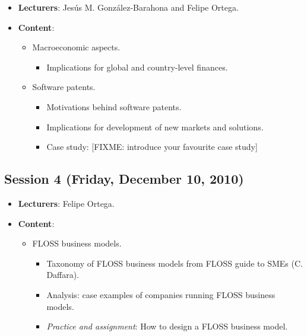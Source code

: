 \documentclass[a4paper]{article}
\begin{document}
\begin{itemize}
 \item \textbf{Lecturers}: Jesús M. González-Barahona and Felipe Ortega.

 \item \textbf{Content}:

    \begin{itemize}
     \item Macroeconomic aspects.
      \begin{itemize}
       \item Implications for global and country-level finances.
       
      \end{itemize}

     \item Software patents.
	\begin{itemize}
	 \item Motivations behind software patents.
	 \item Implications for development of new markets and solutions.
         \item Case study: [FIXME: introduce your favourite case study]
	\end{itemize}

    \end{itemize}

\end{itemize}

\subsection{Session 4 (Friday, December 10, 2010)}

\begin{itemize}
 \item \textbf{Lecturers}: Felipe Ortega.

 \item \textbf{Content}:

    \begin{itemize}
     \item FLOSS business models.
      \begin{itemize}
       \item Taxonomy of FLOSS business models from FLOSS guide to SMEs (C. Daffara).
       \item Analysis: case examples of companies running FLOSS business models.
       \item \textit{Practice and assignment}: How to design a FLOSS business model.
      \end{itemize}

  \end{itemize}
\end{itemize}
\end{document}
